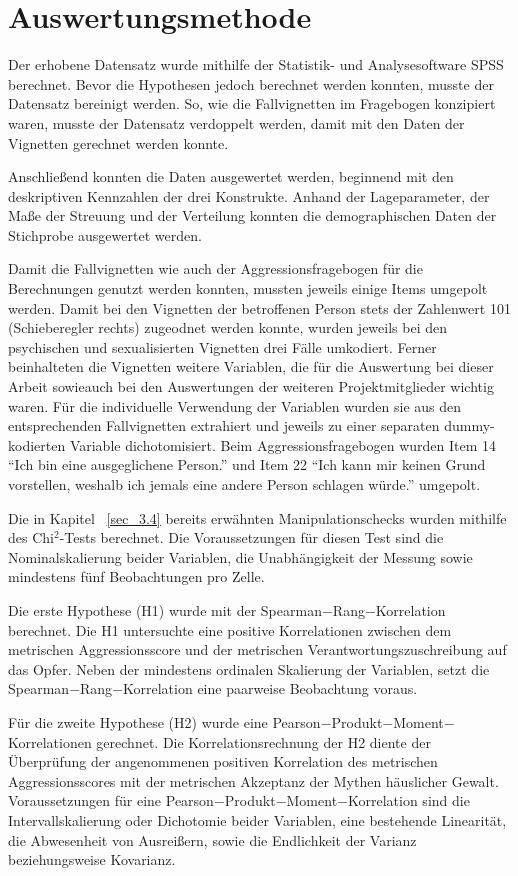 \section{Auswertungsmethode}    \label{sec_3.5}
Der erhobene Datensatz wurde mithilfe der Statistik- und Analysesoftware SPSS\textsuperscript{\textregistered} berechnet. Bevor die Hypothesen jedoch berechnet werden konnten, musste der Datensatz bereinigt werden. So, wie die Fallvignetten im Fragebogen konzipiert waren, musste der Datensatz verdoppelt werden, damit mit den Daten der Vignetten gerechnet werden konnte. 

Anschließend konnten die Daten ausgewertet werden, beginnend mit den deskriptiven Kennzahlen der drei Konstrukte. Anhand der Lageparameter, der Maße der Streuung und der Verteilung konnten die demographischen Daten der Stichprobe ausgewertet werden.

Damit die Fallvignetten wie auch der Aggressionsfragebogen für die Berechnungen genutzt werden konnten, mussten jeweils einige Items umgepolt werden. Damit bei den Vignetten der betroffenen Person stets der Zahlenwert 101 (Schieberegler rechts) zugeodnet werden konnte, wurden jeweils bei den psychischen und sexualisierten Vignetten drei Fälle umkodiert. Ferner beinhalteten die Vignetten weitere Variablen, die für die Auswertung bei dieser Arbeit sowieauch bei den Auswertungen der weiteren Projektmitglieder wichtig waren. Für die individuelle Verwendung der Variablen wurden sie aus den entsprechenden Fallvignetten extrahiert und jeweils zu einer separaten dummy-kodierten Variable dichotomisiert. Beim Aggressionsfragebogen wurden Item 14 \enquote{Ich bin eine ausgeglichene Person.} und Item 22 \enquote{Ich kann mir keinen Grund vorstellen, weshalb ich jemals eine andere Person schlagen würde.} umgepolt.

Die in Kapitel ~\ref{sec_3.4} bereits erwähnten Manipulationschecks wurden mithilfe des Chi$^2$-Tests berechnet. Die Voraussetzungen für diesen Test sind die Nominalskalierung beider Variablen, die Unabhängigkeit der Messung sowie mindestens fünf Beobachtungen pro Zelle. 

Die erste Hypothese (H1) wurde mit der Spearman$-$Rang$-$Korrelation berechnet. Die H1 untersuchte eine positive Korrelationen zwischen dem metrischen Aggressionsscore und der metrischen Verantwortungszuschreibung auf das Opfer. Neben der mindestens ordinalen Skalierung der Variablen, setzt die Spearman$-$Rang$-$Korrelation eine paarweise Beobachtung voraus.  

Für die zweite Hypothese (H2) wurde eine Pearson$-$Produkt$-$Moment$-$Korrelationen gerechnet. Die Korrelationsrechnung der H2 diente der Überprüfung der angenommenen positiven Korrelation des metrischen Aggressionsscores mit der metrischen Akzeptanz der Mythen häuslicher Gewalt. Voraussetzungen für eine Pearson$-$Produkt$-$Moment$-$Korrelation sind die Intervallskalierung oder Dichotomie beider Variablen, eine bestehende Linearität, die Abwesenheit von Ausreißern, sowie die Endlichkeit der Varianz beziehungsweise Kovarianz.


